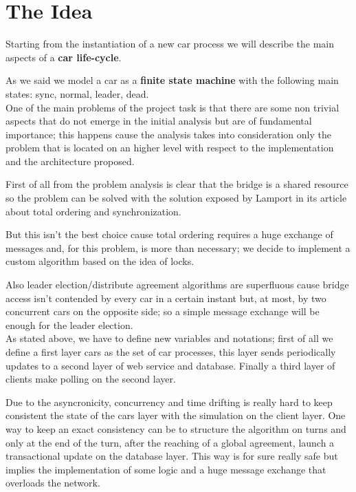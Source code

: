 \chapter{The Idea}

Starting from the instantiation of a new car process we will describe the main aspects 
of a \textbf{car life-cycle}. 

As we said we model a car as a \textbf{finite state machine} 
with the following main states: sync, normal, leader, dead.\\

\noindent
One of the main problems of the project task is that there are some non trivial aspects 
that do not emerge in the initial analysis but are of fundamental importance; 
this happens cause the analysis takes into consideration only the problem 
that is located on an higher level with respect to the implementation and the 
architecture proposed.

First of all from the problem analysis is clear that the bridge is a shared resource 
so the problem can be solved with the solution exposed by Lamport in its 
article~\cite{Lamport:1978} about total ordering and synchronization. 

But this isn't the best choice cause total ordering requires a huge exchange of 
messages and, for this problem, is more than necessary; we decide to implement a 
custom algorithm based on the idea of locks.

Also leader election/distribute agreement algorithms are superfluous cause bridge 
access isn't contended by every car in a certain instant but, at most, 
by two concurrent cars on the opposite side; so a simple message exchange 
will be enough for the leader election. \\

\noindent
As stated above, we have to define new variables and notations; 
first of all we define a first layer cars as the set of car processes,
this layer sends periodically updates to a second layer of web service and 
database. Finally a third layer of clients make polling on the second layer.

Due to the asyncronicity, concurrency and time drifting is really hard 
to keep consistent the state of the cars layer with the simulation 
on the client layer. 
One way to keep an exact consistency can be to structure the algorithm on 
turns and only at the end of the turn, after the reaching of a global agreement,
launch a transactional update on the database layer. 
This way is for sure really safe but implies the implementation of some logic 
and a huge message exchange that overloads the network.

